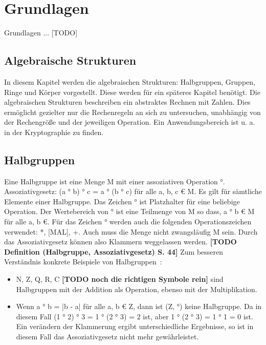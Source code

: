 \section{Grundlagen}
	Grundlagen ... [TODO]
	
	\subsection{Algebraische Strukturen}
		In diesem Kapitel werden die algebraischen Strukturen: Halbgruppen, Gruppen, Ringe und Körper vorgestellt. Diese werden für ein späteres Kapitel benötigt. Die algebraischen Strukturen beschreiben ein abstraktes Rechnen mit Zahlen. Dies ermöglicht gezielter nur die Rechenregeln an sich zu untersuchen, unabhängig von der Rechengröße und der jeweiligen Operation. Ein Anwendungsbereich ist u. a. in der Kryptographie zu finden.~\cite[S.~95]{Kryptographie:und:Algorithmen}
	
		\subsection{Halbgruppen}
			Eine Halbgruppe ist eine Menge M mit einer assoziativen Operation °. Assoziativgesetz: (a ° b) ° c = a ° (b ° c) für alle a, b, c € M. Es gilt für sämtliche Elemente einer Halbgruppe. Das Zeichen ° ist Platzhalter für eine beliebige Operation. Der Wertebereich von ° ist eine Teilmenge von M so dass, a ° b € M für alle a, b €. Für das Zeichen ° werden auch die folgenden Operationszeichen verwendet: *, [MAL], +. Auch muss die Menge nicht zwangsläufig M sein. Durch das Assoziativgesetz können also Klammern weggelassen werden. \textbf{[TODO Definition (Halbgruppe, Assoziativgesetz) S. 44]} Zum besseren Verständnis konkrete Beispiele von Halbgruppen~\cite[S.~45]{Erste:Hilfe:in:Linearer:Algebra}:
			
			\begin{itemize}
				\item N, Z, Q, R, C \textbf{[TODO noch die richtigen Symbole rein]} sind Halbgruppen mit der Addition als Operation, ebenso mit der Multiplikation.
				\item Wenn a ° b = |b - a| für alle a, b € Z, dann ist (Z, °) keine Halbgruppe. Da in diesem Fall (1 ° 2) ° 3 = 1 ° (2 ° 3) = 2 ist, aber 1 ° (2 ° 3) = 1 ° 1 = 0 ist. Ein verändern der Klammerung ergibt unterschiedliche Ergebnisse, so ist in diesem Fall das Assoziativgesetz nicht mehr gewährleistet.
			\end{itemize}
		

